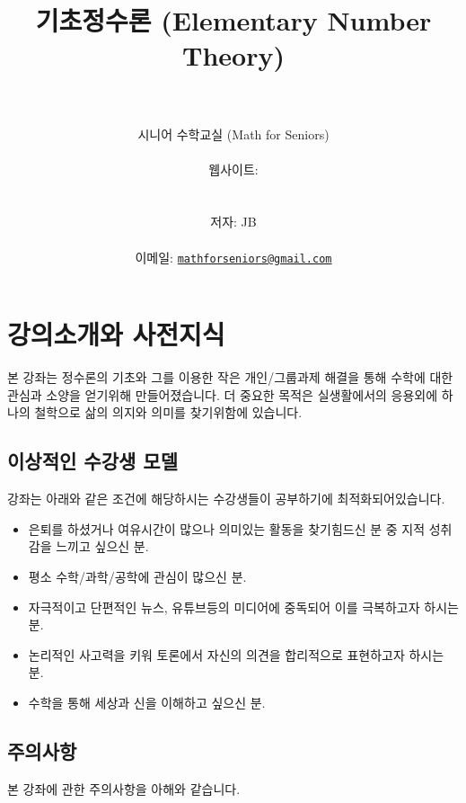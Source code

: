\documentclass[a4paper, 11pt]{report}
\title{\textbf{기초정수론 (Elementary Number Theory)}}
\author{\instrdate\\\\[.5ex]
 시니어 수학교실 (Math for Seniors)\\\\웹사이트: \\\\\\
 저자: JB\\\\이메일: \href{mailto:mathforseniors@gmail.com}{\texttt{mathforseniors@gmail.com}}}
\date{}
\renewcommand{\<}{\langle}
\renewcommand{\>}{\rangle}
\begin{document}
\maketitle
{}

\begingroup
\small
\tableofcontents
\endgroup


\newpage %

\chapter{강의소개와 사전지식}

본 강좌는 정수론의 기초와 그를 이용한 작은 개인/그룹과제 해결을 통해
수학에 대한 관심과 소양을 얻기위해 만들어졌습니다. 더 중요한 목적은 
실생활에서의 응용외에 하나의 철학으로 삶의 의지와 의미를 찾기위함에 
있습니다.

\section{이상적인 수강생 모델}

강좌는 아래와 같은 조건에 해당하시는 수강생들이 공부하기에 최적화되어있습니다.

\begin{itemize}
  \item 은퇴를 하셨거나 여유시간이 많으나 의미있는 활동을 찾기힘드신 분 중
  지적 성취감을 느끼고 싶으신 분.
  \item 평소 수학/과학/공학에 관심이 많으신 분.
  \item 자극적이고 단편적인 뉴스, 유튜브등의 미디어에 중독되어 이를 극복하고자
  하시는 분.
  \item 논리적인 사고력을 키워 토론에서 자신의 의견을 합리적으로 표현하고자
  하시는 분.
  \item 수학을 통해 세상과 신을 이해하고 싶으신 분.
\end{itemize}

\section{주의사항}

본 강좌에 관한 주의사항을 아해와 같습니다.
\end{document}
